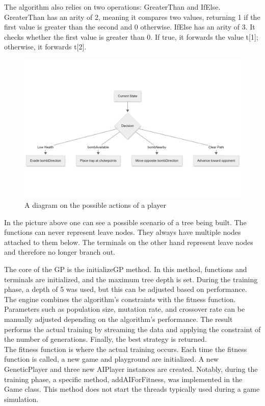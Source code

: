\documentclass[sigconf]{acmart} %
\begin{document}
The algorithm also relies on two operations: GreaterThan and IfElse. GreaterThan has an arity of 2, meaning it compares two values, returning 1 if the first value is greater than the second and 0 otherwise. IfElse has an arity of 3. It checks whether the first value is greater than 0. If true, it forwards the value t[1]; otherwise, it forwards t[2].

\begin{figure}
      \centering
      \includegraphics[width = 1.25\linewidth]{pictures/possibleActionsPlayer.png}
      \caption{\label{fig:possibleActionsPlayer}A diagram on the possible actions of a player}
\end{figure}

In the picture above one can see a possible scenario of a tree being built. The functions can never represent leave nodes. They always have multiple nodes attached to them below. The terminals on the other hand represent leave nodes and therefore no longer branch out. 

The core of the GP is the initializeGP method. In this method, functions and terminals are initialized, and the maximum tree depth is set. During the training phase, a depth of 5 was used, but this can be adjusted based on performance. The engine combines the algorithm's constraints with the fitness function. Parameters such as population size, mutation rate, and crossover rate can be manually adjusted depending on the algorithm's performance. The result performs the actual training by streaming the data and applying the constraint of the number of generations. Finally, the best strategy is returned. \\ 
The fitness function is where the actual training occurs. Each time the fitness function is called, a new game and playground are initialized. A new GeneticPlayer and three new AIPlayer instances are created. Notably, during the training phase, a specific method, addAIForFitness, was implemented in the Game class. This method does not start the threads typically used during a game simulation.
\end{document}
